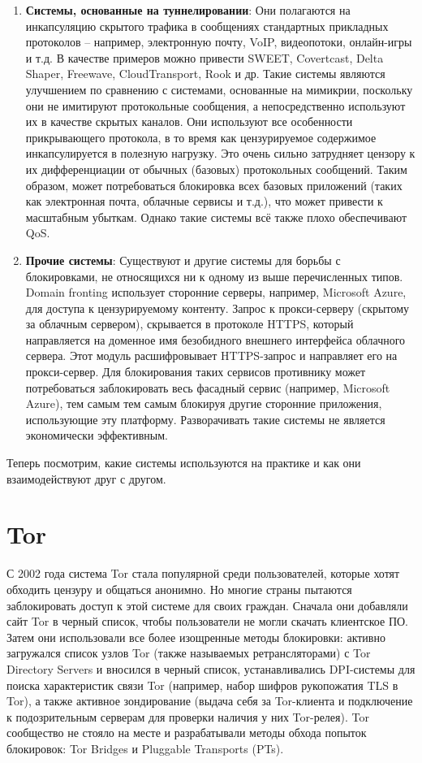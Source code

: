\begin{enumerate}
    \item \textbf{Системы, основанные на туннелировании}:
    Они полагаются на инкапсуляцию скрытого трафика в сообщениях стандартных прикладных протоколов – например, электронную почту, VoIP, видеопотоки, онлайн-игры и т.д.
    В качестве примеров можно привести SWEET, Covertcast, Delta Shaper, Freewave, CloudTransport, Rook и др.
    Такие системы являются улучшением по сравнению с системами, основанные на мимикрии, поскольку они не имитируют протокольные сообщения,
    а непосредственно используют их в качестве скрытых каналов.
    Они используют все особенности прикрывающего протокола, в то время как цензурируемое содержимое инкапсулируется в полезную нагрузку.
    Это очень сильно затрудняет цензору к их дифференциации от обычных (базовых) протокольных сообщений.
    Таким образом, может потребоваться блокировка всех базовых приложений (таких как электронная почта, облачные сервисы и т.д.), что может привести к масштабным убыткам.
    Однако такие системы всё также плохо обеспечивают QoS.

    \item \textbf{Прочие системы}:
    Существуют и другие системы для борьбы с блокировками, не относящихся ни к одному из выше перечисленных типов.
    Domain fronting использует сторонние серверы, например, Microsoft Azure, для доступа к цензурируемому контенту.
    Запрос к прокси-серверу (скрытому за облачным сервером), скрывается в протоколе HTTPS, который направляется на доменное имя безобидного внешнего интерфейса облачного сервера.
    Этот модуль расшифровывает HTTPS-запрос и направляет его на прокси-сервер.
    Для блокирования таких сервисов противнику может потребоваться заблокировать весь фасадный сервис (например, Microsoft Azure), тем самым
    тем самым блокируя другие сторонние приложения, использующие эту платформу. Разворачивать такие системы не является экономически эффективным.


\end{enumerate}

Теперь посмотрим, какие системы используются на практике и как они взаимодействуют друг с другом.

\section{Tor}

С 2002 года система Tor стала популярной среди пользователей, которые хотят обходить цензуру и общаться анонимно.
Но многие страны пытаются заблокировать доступ к этой системе для своих граждан.
Сначала они добавляли сайт Tor в черный список, чтобы пользователи не могли скачать клиентское ПО.
Затем они использовали все более изощренные методы блокировки:
активно загружался список узлов Tor (также называемых ретрансляторами) с Tor Directory Servers и вносился в черный список,
устанавливались DPI-системы для поиска характеристик связи Tor (например, набор шифров рукопожатия TLS в Tor), а также активное зондирование
(выдача себя за Tor-клиента и подключение к подозрительным серверам для проверки наличия у них Tor-релея).
Tor сообщество не стояло на месте и разрабатывали методы обхода попыток блокировок: Tor Bridges и Pluggable Transports (PTs).

